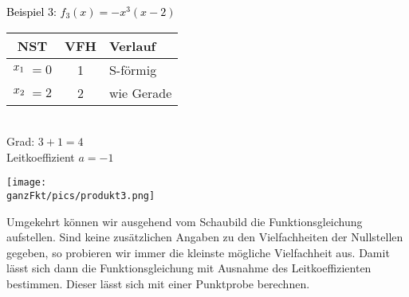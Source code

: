 \begin{minipage}{\linewidth}
	{\color{loes}\begin{minipage}{0.5\linewidth}
			\textcolor{black}{Beispiel 3: \(f_3(x)=-x^3(x-2)\)}\\
			\begin{tabular}{rlcl}
				\multicolumn{2}{c}{NST}&VFH&Verlauf\\
				\midrule
				\(x_1\hspace{-0.3cm}\)&\(=0\)&1&S-förmig\\
				\(x_2\hspace{-0.3cm}\)&\(=2\)&2&wie Gerade
			\end{tabular}\\
			Grad: \(3+1=4\)\\
			Leitkoeffizient \(a=-1\)\\
	\end{minipage}}
	\begin{minipage}{0.5\linewidth}
		\texttt{[image: \\ganzFkt/pics/produkt3.png]}
	\end{minipage}
\end{minipage}
\newpage
Umgekehrt können wir ausgehend vom Schaubild die Funktionsgleichung aufstellen. Sind keine zusätzlichen Angaben zu den Vielfachheiten der Nullstellen gegeben, so probieren wir immer die kleinste mögliche Vielfachheit aus. Damit lässt sich dann die Funktionsgleichung mit Ausnahme des Leitkoeffizienten bestimmen. Dieser lässt sich mit einer Punktprobe berechnen.\vspace{0.15cm}\\
